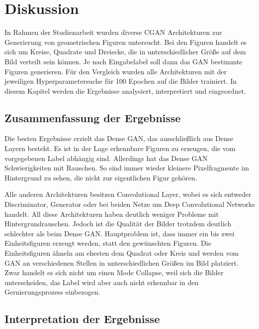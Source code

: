 
\chapter{Diskussion}

In Rahmen der Studienarbeit wurden diverse CGAN Architekturen zur Generierung von geometrischen Figuren untersucht.
Bei den Figuren handelt es sich um Kreise, Quadrate und Dreiecke, die in unterschiedlicher Größe auf dem Bild verteilt sein können.
Je nach Eingabelabel soll dann das GAN bestimmte Figuren generieren.
Für den Vergleich wurden alle Architekturen mit der jeweiligen Hyperparametersuche für 100 Epochen auf die Bilder trainiert.
In diesem Kapitel werden die Ergebnisse analysiert, interpretiert und eingeordnet.

\section{Zusammenfassung der Ergebnisse}
Die besten Ergebnisse erzielt das Dense GAN, das ausschließlich aus Dense Layern besteht.
Es ist in der Lage erkennbare Figuren zu erzeugen, die vom vorgegebenen Label abhängig sind.
Allerdings hat das Dense GAN Schwierigkeiten mit Rauschen.
So sind immer wieder kleinere Pixelfragmente im Hintergrund zu sehen, die nicht zur eigentlichen Figur gehören.
\newline

Alle anderen Architekturen besitzen Convolutional Layer, wobei es sich entweder Discriminator, Generator oder bei beiden Netze um Deep Convolutional Networks handelt.
All diese Architekturen haben deutlich weniger Probleme mit Hintergrundrauschen.
Jedoch ist die Qualität der Bilder trotzdem deutlich schlechter als beim Dense GAN.
Hauptproblem ist, dass immer ein bis zwei Einheitsfiguren erzeugt werden, statt den gewünschten Figuren.
Die Einheitsfiguren ähneln am ehesten dem Quadrat oder Kreis und werden vom GAN an verschiedenen Stellen in unterschiedlichen Größen im Bild platziert.
Zwar handelt es sich nicht um einen Mode Collapse, weil sich die Bilder unterscheiden, das Label wird aber auch nicht erkennbar in den Gernierungsprozess einbezogen.

\section{Interpretation der Ergebnisse}

